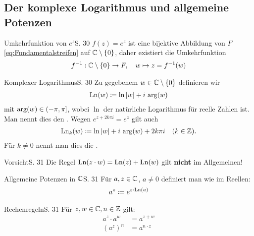 \subsection{Der komplexe Logarithmus und allgemeine Potenzen}

\begin{bemerkung}{Umkehrfunktion von $e^z$}{S. 30}
  $f(z) = e^z$ ist eine bijektive Abbildung von $F$ \eqref{eq:Fundamentalstreifen} auf $\mathbb{C} \setminus \{ 0 \}$, daher existiert die Umkehrfunktion
  \begin{align}
    f^{-1} : \mathbb{C} \setminus \{ 0 \} \to F, \quad w \mapsto z = f^{-1}(w)
  \end{align}
\end{bemerkung}

\begin{bemerkung}{Komplexer Logarithmus}{S. 30}
  Zu gegebenem $w \in \mathbb{C}\setminus\{0\}$ definieren wir
  \begin{align}
    \operatorname{Ln}(w) \coloneqq \ln |w| + i \, \operatorname{arg}(w)
  \end{align}
  mit $\operatorname{arg}(w) \in (-\pi,\pi]$, wobei $\ln$ der natürliche Logarithmus für reelle Zahlen ist.
  Man nennt dies den .
  Wegen $e^{z + 2 k \pi i} = e^z$ gilt auch
  \begin{align}
    \operatorname{Ln}_k(w) \coloneqq \ln |w| + i \, \operatorname{arg}(w) + 2 k \pi i \quad (k \in \mathbb{Z}) .
  \end{align}
  Für $k \neq 0$ nennt man dies die .
\end{bemerkung}

\begin{bemerkung}{Vorsicht}{S. 31}
  Die Regel $\operatorname{Ln}(z \cdot w) = \operatorname{Ln}(z) + \operatorname{Ln}(w)$ gilt \textbf{nicht} im Allgemeinen!
\end{bemerkung}

\begin{bemerkung}{Allgemeine Potenzen in $\mathbb{C}$}{S. 31}
  Für $a, z \in \mathbb{C}$, $a \neq 0$ definiert man wie im Reellen:
  \begin{align}
    a^z \coloneqq e^{z \cdot \operatorname{Ln}(a)}
  \end{align}
\end{bemerkung}

\begin{bemerkung}{Rechenregeln}{S. 31}
  Für $z, w \in \mathbb{C}, n \in \mathbb{Z}$ gilt:
  \begin{align}
    a^z \cdot a^w &= a^{z+w}\\
    \left( a^z \right)^n &= a^{n \cdot z}
  \end{align}
\end{bemerkung}



